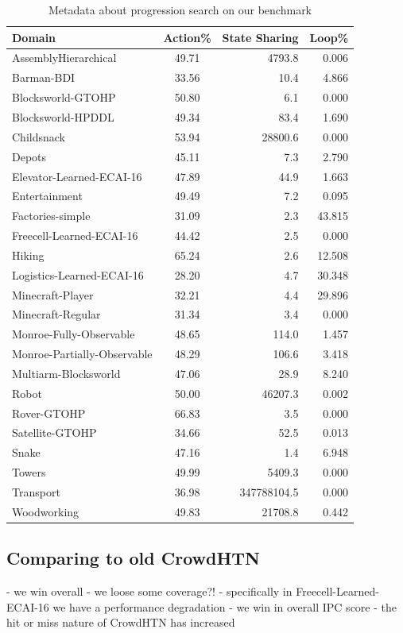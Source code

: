 \begin{table}
	\caption{Metadata about progression search on our benchmark}
	\label{table: tohtn metadata}
	\centering
	\begin{tabular}{|l|c|r|r|}
		\hline
		Domain & Action\% & State Sharing & Loop\% \\
		\hline
		AssemblyHierarchical & 49.71 & 4793.8 & 0.006\\
		Barman-BDI & 33.56 & 10.4 & 4.866\\
		Blocksworld-GTOHP & 50.80 & 6.1 & 0.000\\
		Blocksworld-HPDDL & 49.34 & 83.4 & 1.690\\
		Childsnack & 53.94 & 28800.6 & 0.000\\
		Depots & 45.11 & 7.3 & 2.790\\
		Elevator-Learned-ECAI-16 & 47.89 & 44.9 & 1.663\\
		Entertainment & 49.49 & 7.2 & 0.095\\
		Factories-simple & 31.09 & 2.3 & 43.815\\
		Freecell-Learned-ECAI-16 & 44.42 & 2.5 & 0.000\\
		Hiking & 65.24 & 2.6 & 12.508\\
		Logistics-Learned-ECAI-16 & 28.20 & 4.7 & 30.348\\
		Minecraft-Player & 32.21 & 4.4 & 29.896\\
		Minecraft-Regular & 31.34 & 3.4 & 0.000\\
		Monroe-Fully-Observable & 48.65 & 114.0 & 1.457\\
		Monroe-Partially-Observable & 48.29 & 106.6 & 3.418\\
		Multiarm-Blocksworld & 47.06 & 28.9 & 8.240\\
		Robot & 50.00 & 46207.3 & 0.002\\
		Rover-GTOHP & 66.83 & 3.5 & 0.000\\
		Satellite-GTOHP & 34.66 & 52.5 & 0.013\\
		Snake & 47.16 & 1.4 & 6.948\\
		Towers & 49.99 & 5409.3 & 0.000\\
		Transport & 36.98 & 347788104.5 & 0.000\\
		Woodworking & 49.83 & 21708.8 & 0.442\\
		\hline
	\end{tabular}
\end{table}

\subsection{Comparing to old CrowdHTN}
- we win overall
- we loose some coverage?!
- specifically in Freecell-Learned-ECAI-16 we have a performance degradation
- we win in overall IPC score
- the hit or miss nature of CrowdHTN has increased

